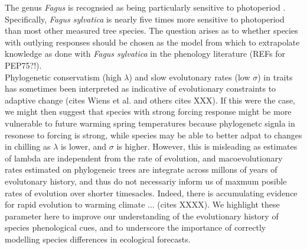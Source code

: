 \documentclass{article}\usepackage[]{graphicx}\usepackage[]{color}
\begin{document}
The genus \emph{Fagus} is recognsied as being particularly sensitive to photoperiod \citep{fu2019}. Specifically, \emph{Fagus sylvatica} is nearly five times more sensitive to photoperiod than most other measured tree species. The question arises as to whether species with outlying responses should be chosen as the model from which to extrapolate knowledge as done with \emph{Fagus sylvatica} in the phenology literature (REFs for PEP75?!). \\%

Phylogenetic conservatism (high $\lambda$) and slow evolutonary rates (low $\sigma$) in traits has sometimes been interpreted as indicative of evolutionary constraints to adaptive change (cites Wiens et al. and others cites XXX). If this were the case, we might then suggest that species with strong forcing response might be more vulnerable to future warming spring temperatures because phylogenetc signla in resonese to forcing is strong, while species may be able to better adpat to changes in chilling as $\lambda$ is lower, and $\sigma$ is higher. However, this is misleading as estimates of lambda are independent from the rate of evolution, and macoevolutionary rates estimated on phylogeneic trees are integrate across millons of years of evolutonary history, and thus do not necessariy inform us of maxmum posible rates of evolution over shorter timesacles. Indeed, there is accumulating evidence for rapid evolution to warming climate ... (cites XXXX). We highlight these parameter here to improve our understanding of the evolutionary history of species phenological cues, and to underscore the importance of correctly modelling species differences in ecological forecasts. 
\\

\end{document}
